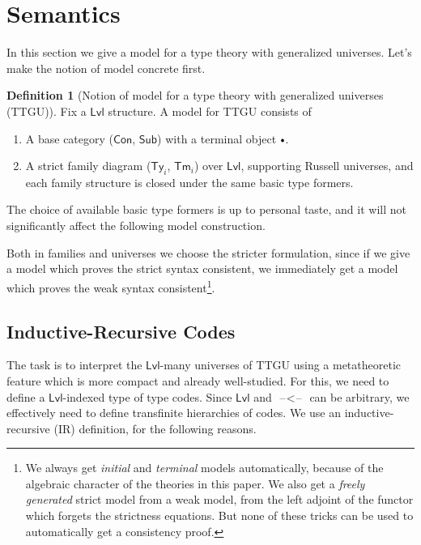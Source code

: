 \documentclass[a4paper,UKenglish,cleveref, autoref, thm-restate]{lipics-v2021}
\theoremstyle{remark}
\theoremstyle{definition}
\newtheorem{mydefinition}{Definition}
\newcommand{\Con}{\mathsf{Con}}
\newcommand{\Ty}{\mathsf{Ty}}
\newcommand{\Tm}{\mathsf{Tm}}
\newcommand{\Sub}{\mathsf{Sub}}
\newcommand{\emptycon}{\scaleobj{.75}\bullet}
\newcommand{\blank}{\mathord{\hspace{1pt}\text{--}\hspace{1pt}}}
\newcommand{\Lvl}{\mathsf{Lvl}}
\begin{document}
\section{Semantics}
\label{sec:semantics}

In this section we give a model for a type theory with generalized
universes. Let's make the notion of model concrete first.

\begin{mydefinition}[Notion of model for a type theory with generalized universes (TTGU)]
Fix a $\Lvl$ structure. A model for TTGU consists of
\begin{enumerate}
  \item A base category ($\Con$, $\Sub$) with a terminal object $\emptycon$.
  \item A strict family diagram ($\Ty_i$, $\Tm_i$) over $\Lvl$, supporting Russell
        universes, and each family structure is closed under the same basic type formers.
\end{enumerate}
\end{mydefinition}

The choice of available basic type formers is up to personal taste, and it will
not significantly affect the following model construction.

Both in families and universes we choose the stricter formulation, since if we
give a model which proves the strict syntax consistent, we immediately get a model which
proves the weak syntax consistent\footnote{We always get \emph{initial} and \emph{terminal}
models automatically, because of the algebraic character of the theories in this paper. We
also get a \emph{freely generated} strict model from a weak model, from the left adjoint
of the functor which forgets the strictness equations. But none of these tricks can be used
to automatically get a consistency proof.}.

\subsection{Inductive-Recursive Codes}
\label{sec:inductive_recursive_codes}

The task is to interpret the $\Lvl$-many universes of TTGU using a metatheoretic
feature which is more compact and already well-studied. For this, we need to
define a $\Lvl$-indexed type of type codes. Since $\Lvl$ and $\!\blank<\!\blank$
can be arbitrary, we effectively need to define transfinite hierarchies of
codes. We use an inductive-recursive (IR) \cite{dybjer99finite} definition, for
the following reasons.
\end{document}
